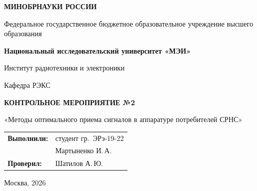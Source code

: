 \begin{titlepage}
    \centering
    {\bfseries МИНОБРНАУКИ РОССИИ\par}
    Федеральное государственное бюджетное образовательное учреждение высшего образования \\
    {\bfseries Национальный исследовательский университет «МЭИ»\par}
    \vspace{1cm}
    Институт радиотехники и электроники\par
    Кафедра РЭКС\par
    \vspace{3cm}
    
    {\bfseries\large КОНТРОЛЬНОЕ МЕРОПРИЯТИЕ №2\par}
    \vspace{0.5cm}
    {\large «Методы оптимального приема сигналов в аппаратуре потребителей СРНС»\par}
    
    \vspace{3.5cm}
 \vspace{1.5cm}
\noindent\hfill
\begin{tabular}{@{}ll@{}}
    \textbf{Выполнили:} & студент гр.~ЭРэ-19-22 \\
                        & Мартыненко И.\,А. \\
    \textbf{Проверил:}  & Шатилов А.\,Ю.
\end{tabular}   
    \vfill
    {Москва, 2026}
\end{titlepage}
